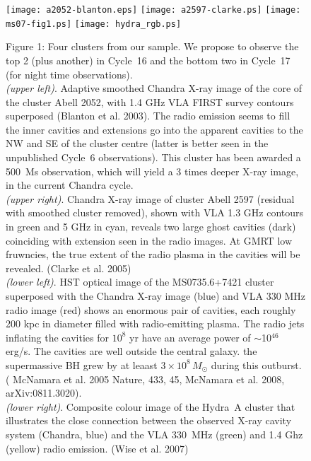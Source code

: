 \documentclass{article}
\begin{document}
\begin{figure}



\texttt{[image: a2052-blanton.eps]}
\texttt{[image: a2597-clarke.ps]}
\texttt{[image: ms07-fig1.ps]}
\texttt{[image: hydra\_rgb.ps]}



{\footnotesize
Figure 1:  Four clusters from our sample. We propose to observe the
top 2 (plus another) in Cycle~16 
and the bottom two in Cycle~17 (for night time observations).
\vspace{0.05in}\\
{\it (upper left)}. Adaptive smoothed Chandra 
X-ray image of the core of the cluster Abell 2052, with
1.4 GHz VLA FIRST survey contours superposed  (Blanton et al. 2003).
The radio emission seems to fill the inner cavities and extensions go into the apparent cavities to the NW and SE of the cluster centre (latter is better seen
in the unpublished Cycle~6 observations). This cluster has been awarded a
500~Ms observation, which will yield a 3 times deeper X-ray image, in the current Chandra cycle.
\vspace{0.05in}\\
{\it (upper right)}. Chandra X-ray image 
of cluster Abell 2597 (residual with smoothed cluster removed),
shown with VLA 1.3 GHz contours in green and 5 GHz in cyan,
reveals two large ghost cavities (dark) coinciding with 
extension seen in the radio images. At GMRT low fruwncies, the true
extent of the radio plasma in the cavities will be revealed.
(Clarke et al. 2005)
\vspace{0.05in}\\
{\it (lower left)}. HST optical image of the MS0735.6+7421 cluster
superposed with the Chandra X-ray image (blue) and VLA 330 MHz radio 
image (red) shows an enormous pair of cavities, each roughly 200 kpc in diameter filled with radio-emitting plasma. The radio jets inflating the cavities
for $10^8$ yr have an average power of $\sim$10$^{46}$ erg/s. The cavities
are well outside the central galaxy. the supermassive BH grew by at leaast $3\times 10^8\,M_\odot$ during this outburst. (
McNamara et al. 2005 Nature, 433,
45, McNamara et al. 2008, arXiv:0811.3020).
\vspace{0.05in}\\
{\it (lower right)}. Composite colour image of 
the Hydra~A cluster that illustrates the close connection between
the observed X-ray cavity system (Chandra, blue) and the VLA
330~MHz (green) and 1.4 Ghz (yellow) radio emission.
(Wise et al. 2007)

}

\end{figure}


\end{document}
